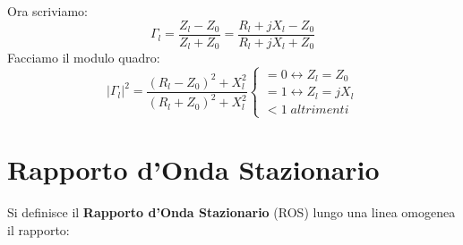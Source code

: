 Ora scriviamo:
\begin{equation*}
    \Gamma_l = \frac{Z_l - Z_0}{Z_l + Z_0} = \frac{R_l + jX_l - Z_0}{R_l + jX_l + Z_0}
\end{equation*}
Facciamo il modulo quadro:
\begin{equation*}
    |\Gamma_l|^2 =  \frac{{(R_l - Z_0)}^2 + X_l^2 }{{(R_l + Z_0)}^2 + X_l^2}
    \begin{cases}
    = 0  \leftrightarrow Z_l = Z_0\\
    = 1  \leftrightarrow Z_l = jX_l\\
    < 1  \; altrimenti
    \end{cases}
\end{equation*}
\section{Rapporto d'Onda Stazionario}
Si definisce il \textbf{Rapporto d'Onda Stazionario} (ROS) lungo una linea omogenea il rapporto:

